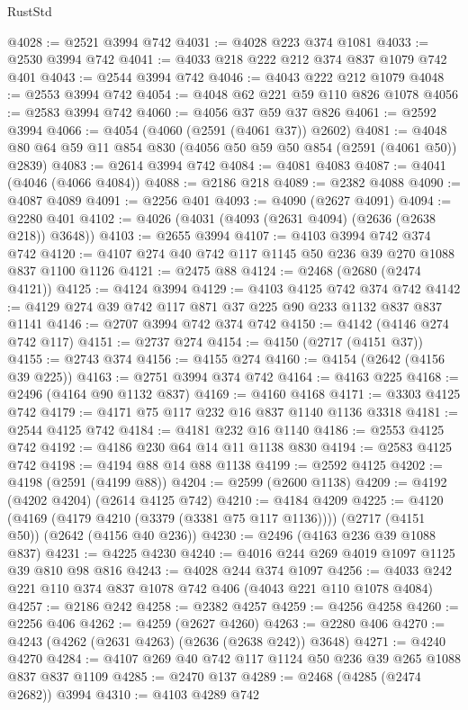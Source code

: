 \begin{lexlean}{RustStd}
\begin{coremodule}
@4028 := @2521 @3994 @742
@4031 := @4028 @223 @374 @1081
@4033 := @2530 @3994 @742
@4041 := @4033 @218 @222 @212 @374 @837 @1079 @742 @401
@4043 := @2544 @3994 @742
@4046 := @4043 @222 @212 @1079
@4048 := @2553 @3994 @742
@4054 := @4048 @62 @221 @59 @110 @826 @1078
@4056 := @2583 @3994 @742
@4060 := @4056 @37 @59 @37 @826
@4061 := @2592 @3994
@4066 := @4054 (@4060 (@2591 (@4061 @37)) @2602)
@4081 := @4048 @80 @64 @59 @11 @854 @830 (@4056 @50 @59 @50 @854 (@2591 (@4061 @50)) @2839)
@4083 := @2614 @3994 @742
@4084 := @4081 @4083
@4087 := @4041 (@4046 (@4066 @4084))
@4088 := @2186 @218
@4089 := @2382 @4088
@4090 := @4087 @4089
@4091 := @2256 @401
@4093 := @4090 (@2627 @4091)
@4094 := @2280 @401
@4102 := @4026 (@4031 (@4093 (@2631 @4094) (@2636 (@2638 @218)) @3648))
@4103 := @2655 @3994
@4107 := @4103 @3994 @742 @374 @742
@4120 := @4107 @274 @40 @742 @117 @1145 @50 @236 @39 @270 @1088 @837 @1100 @1126
@4121 := @2475 @88
@4124 := @2468 (@2680 (@2474 @4121))
@4125 := @4124 @3994
@4129 := @4103 @4125 @742 @374 @742
@4142 := @4129 @274 @39 @742 @117 @871 @37 @225 @90 @233 @1132 @837 @837 @1141
@4146 := @2707 @3994 @742 @374 @742
@4150 := @4142 (@4146 @274 @742 @117)
@4151 := @2737 @274
@4154 := @4150 (@2717 (@4151 @37))
@4155 := @2743 @374
@4156 := @4155 @274
@4160 := @4154 (@2642 (@4156 @39 @225))
@4163 := @2751 @3994 @374 @742
@4164 := @4163 @225
@4168 := @2496 (@4164 @90 @1132 @837)
@4169 := @4160 @4168
@4171 := @3303 @4125 @742
@4179 := @4171 @75 @117 @232 @16 @837 @1140 @1136 @3318
@4181 := @2544 @4125 @742
@4184 := @4181 @232 @16 @1140
@4186 := @2553 @4125 @742
@4192 := @4186 @230 @64 @14 @11 @1138 @830
@4194 := @2583 @4125 @742
@4198 := @4194 @88 @14 @88 @1138
@4199 := @2592 @4125
@4202 := @4198 (@2591 (@4199 @88))
@4204 := @2599 (@2600 @1138)
@4209 := @4192 (@4202 @4204) (@2614 @4125 @742)
@4210 := @4184 @4209
@4225 := @4120
    (@4169 (@4179 @4210 (@3379 (@3381 @75 @117 @1136))))
    (@2717 (@4151 @50))
    (@2642 (@4156 @40 @236))
@4230 := @2496 (@4163 @236 @39 @1088 @837)
@4231 := @4225 @4230
@4240 := @4016 @244 @269 @4019 @1097 @1125 @39 @810 @98 @816
@4243 := @4028 @244 @374 @1097
@4256 := @4033 @242 @221 @110 @374 @837 @1078 @742 @406 (@4043 @221 @110 @1078 @4084)
@4257 := @2186 @242
@4258 := @2382 @4257
@4259 := @4256 @4258
@4260 := @2256 @406
@4262 := @4259 (@2627 @4260)
@4263 := @2280 @406
@4270 := @4243 (@4262 (@2631 @4263) (@2636 (@2638 @242)) @3648)
@4271 := @4240 @4270
@4284 := @4107 @269 @40 @742 @117 @1124 @50 @236 @39 @265 @1088 @837 @837 @1109
@4285 := @2470 @137
@4289 := @2468 (@4285 (@2474 @2682)) @3994
@4310 := @4103
    @4289
    @742

\end{coremodule}
\end{lexlean}
